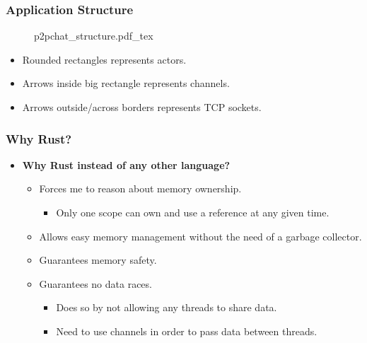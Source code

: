 \begin{frame}
  \frametitle{Application Structure}
  \begin{figure}
    \def\svgwidth{0.7\textwidth}
    {p2pchat_structure.pdf_tex}
  \end{figure}

  \begin{itemize}
    \item<2-> Rounded rectangles represents actors.
    \item<3-> Arrows inside big rectangle represents channels.
    \item<4-> Arrows outside/across borders represents TCP sockets.
  \end{itemize}
\end{frame}

\begin{frame}
  \frametitle{Why Rust?}
  \begin{itemize}
    \item \textbf{Why Rust instead of any other language?}\\
      \begin{itemize}
        \item<2-> Forces me to reason about memory ownership.
          \begin{itemize}
            \item<3-> Only one scope can own and use a reference at any given time.
          \end{itemize}
        \item<4-> Allows easy memory management without the need of a garbage collector.
        \item<5-> Guarantees memory safety.
        \item<6-> Guarantees no data races.
          \begin{itemize}
            \item<7-> Does so by not allowing any threads to share data.\footnotemark
            \item<8> Need to use channels in order to pass data between threads.
          \end{itemize}
      \end{itemize}
  \end{itemize}

\end{frame}
